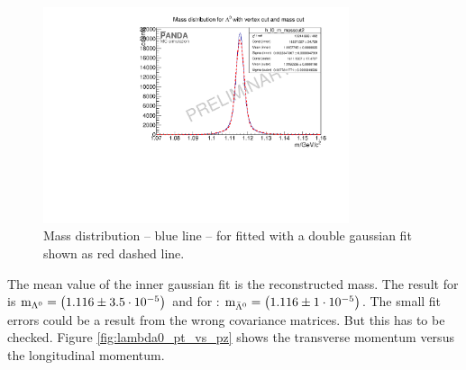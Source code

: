 		\begin{figure}
			\centering
				\includegraphics[width=0.8\textwidth]{./plots/lambda0/lambda0_m_masscut2.pdf}
			\caption{Mass distribution -- blue line -- for \lam fitted with a double gaussian fit shown as red dashed line.}
			\label{fig:lambda0_massfit}
		\end{figure}
		
		The mean value of the inner gaussian fit is the reconstructed mass.
		The result for \lam is $\textnormal{m}_{\Lambda^0} = \left(1.116 \pm 3.5\cdot 10^{-5}\right)$ \massunit and for \alam: $\textnormal{m}_{\bar{\Lambda}^0} = \left(1.116 \pm 1\cdot 10^{-5}\right)$\massunit. 
		The small fit errors could be a result from the wrong covariance matrices. 
		But this has to be checked. 
		Figure \ref{fig:lambda0_pt_vs_pz} shows the transverse momentum versus the longitudinal momentum.
				
